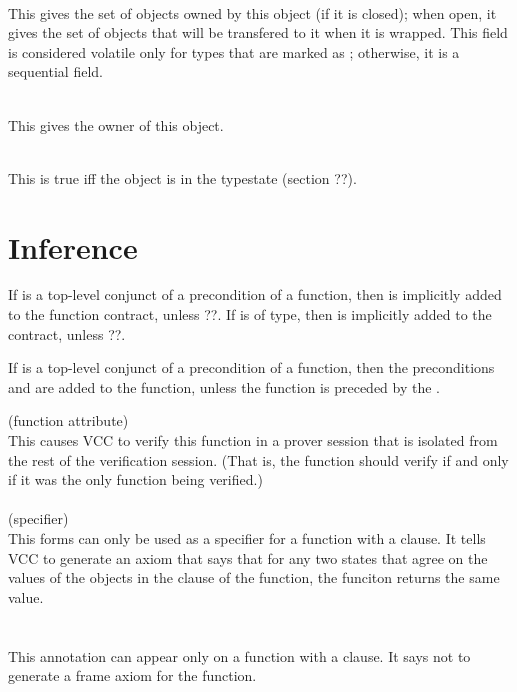 \documentclass[preprint,nocopyrightspace]{sigplanconf}
\begin{document}
{{{\\
This gives the set of objects owned by this object (if it is closed);
when open, it gives the set of objects that will be transfered to it
when it is wrapped.  This field is considered volatile only for types
that are marked as ; otherwise, it is a
sequential field.

\vcc{\volatile \object \owner}\\
This gives the owner of this object. 

\\
This is true iff the object is in the typestate (section ??). 



\section{Inference}

If  is a top-level conjunct of a precondition of a
function, then   is implicitly added
to the function contract, unless ??. If  is of \vcc{\claim}
type, then  is implicitly added to
the contract, unless ??.

If  is a top-level conjunct of a
precondition of a function, then the
preconditions 
and  are added to the
function, unless the function is preceded by the .


 (function attribute)\\
This causes VCC to verify this function in a prover session that is
isolated from the rest of the verification session. (That is, the
function should verify if and only if it was the only function being verified.)
\\\\
 (specifier)\\
This forms can only be used as a specifier for a   function
with a  clause. It tells VCC to generate an axiom that says
that for any two states that agree on the values of the objects in the
 clause of the function, the funciton returns the same
value.
\\\\
\\
This annotation can appear only on a  function with
a  clause. It says not to generate a frame axiom for the
function. 

}}}
\end{document}
